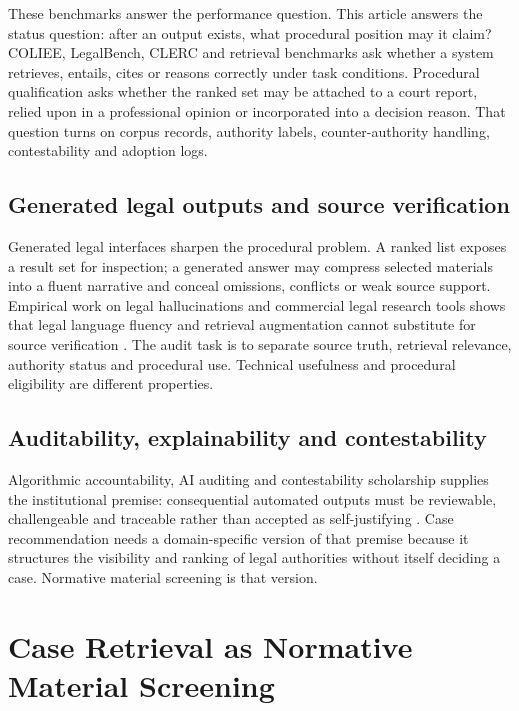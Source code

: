 \documentclass[12pt,a4paper]{article}
\begin{document}
These benchmarks answer the performance question. This article answers the status question: after an output exists, what procedural position may it claim? COLIEE, LegalBench, CLERC and retrieval benchmarks ask whether a system retrieves, entails, cites or reasons correctly under task conditions. Procedural qualification asks whether the ranked set may be attached to a court report, relied upon in a professional opinion or incorporated into a decision reason. That question turns on corpus records, authority labels, counter-authority handling, contestability and adoption logs.

\subsection{Generated legal outputs and source verification}

Generated legal interfaces sharpen the procedural problem. A ranked list exposes a result set for inspection; a generated answer may compress selected materials into a fluent narrative and conceal omissions, conflicts or weak source support. Empirical work on legal hallucinations and commercial legal research tools shows that legal language fluency and retrieval augmentation cannot substitute for source verification \citep{dahl2024,magesh2025}. The audit task is to separate source truth, retrieval relevance, authority status and procedural use. Technical usefulness and procedural eligibility are different properties.

\subsection{Auditability, explainability and contestability}

Algorithmic accountability, AI auditing and contestability scholarship supplies the institutional premise: consequential automated outputs must be reviewable, challengeable and traceable rather than accepted as self-justifying \citep{kroll2017,raji2020,mokander2023,wachter2017,binns2018,citron2014,veale2018}. Case recommendation needs a domain-specific version of that premise because it structures the visibility and ranking of legal authorities without itself deciding a case. Normative material screening is that version.

\section{Case Retrieval as Normative Material Screening}
\end{document}
